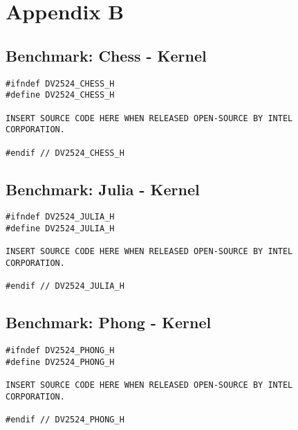 
\chapter*{Appendix B}
\label{cha:appendixb}

\section*{Benchmark: Chess - Kernel}
\label{sec:appendixb_benchmarkchesskernel}
\begin{lstlisting}
#ifndef DV2524_CHESS_H
#define DV2524_CHESS_H

INSERT SOURCE CODE HERE WHEN RELEASED OPEN-SOURCE BY INTEL CORPORATION.

#endif // DV2524_CHESS_H
\end{lstlisting}

\section*{Benchmark: Julia - Kernel}
\label{sec:appendixb_benchmarkjuliakernel}
\begin{lstlisting}
#ifndef DV2524_JULIA_H
#define DV2524_JULIA_H

INSERT SOURCE CODE HERE WHEN RELEASED OPEN-SOURCE BY INTEL CORPORATION.

#endif // DV2524_JULIA_H
\end{lstlisting}

\section*{Benchmark: Phong - Kernel}
\label{sec:appendixb_benchmarkphongkernel}
\begin{lstlisting}
#ifndef DV2524_PHONG_H
#define DV2524_PHONG_H

INSERT SOURCE CODE HERE WHEN RELEASED OPEN-SOURCE BY INTEL CORPORATION.

#endif // DV2524_PHONG_H
\end{lstlisting}
